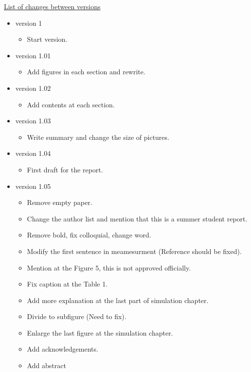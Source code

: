 \underline{List of changes between versions}

\begin{itemize}


\item version 1 
\begin{itemize}
\item Start version.
\end{itemize}

\item version 1.01
\begin{itemize}
\item Add figures in each section and rewrite.
\end{itemize}

\item version 1.02
\begin{itemize}
\item Add contents at each section.
\end{itemize}

\item version 1.03
\begin{itemize}
\item Write summary and change the size of pictures.
\end{itemize}

\item version 1.04
\begin{itemize}
\item First draft for the report.
\end{itemize}

\item version 1.05
\begin{itemize}
\item Remove empty paper.
\item Change the author list and mention that this is a summer student report.
\item Remove bold, fix colloquial, change word.
\item Modify the first sentence in meamesurment (Reference should be fixed).
\item Mention at the Figure 5, this is not approved officially.
\item Fix caption at the Table 1.
\item Add more explanation at the last part of simulation chapter.
\item Divide to subfigure (Need to fix).
\item Enlarge the last figure at the simulation chapter.
\item Add acknowledgements.
\item Add abstract
\end{itemize}

\end{itemize}

\clearpage

